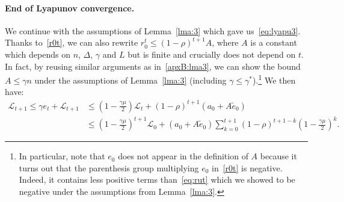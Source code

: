 \documentclass[twoside]{article}
\newcommand{\stepsize}{\gamma}
\newcommand{\strongconvex}{\mu}
\newcommand{\contraction}{\rho}
\newcommand{\sparsity}{\Delta}
\newcommand{\lipschitz}{L}
\newcommand{\lyapunov}{\mathcal{L}}
\begin{document}
\paragraph{End of Lyapunov convergence.}
We continue with the assumptions of Lemma~\ref{lma:3} which gave us~\eqref{eq:lyapu3}.
Thanks to~\eqref{r0t}, we can also rewrite $r_0^t \leq (1 -\contraction)^{t+1} A$, where $A$ is a constant which depends on $n$, $\sparsity$, $\stepsize$ and $\lipschitz$ but is finite and crucially does not depend on $t$.
In fact, by reusing similar arguments as in~\ref{apxB:lma3}, we can show the bound $A \leq \stepsize n$ under the assumptions of Lemma~\ref{lma:3} (including $\stepsize \leq \stepsize^*$).\footnote{In particular, note that $e_0$ does not appear in the definition of $A$ because it turns out that the parenthesis group multiplying $e_0$ in~\eqref{r0t} is negative. Indeed, it contains less positive terms than~\eqref{eq:rut} which we showed to be negative under the assumptions from Lemma~\ref{lma:3}.}
We then have:
\begin{align}
\lyapunov_{t+1}  \leq \stepsize e_t + \lyapunov_{t+1} 
&\leq (1-\frac{\stepsize\strongconvex}{2})\lyapunov_t  +(1 - \contraction)^{t+1} (a_0 + A \tilde e_0) 
\nonumber \\
&\leq (1-\frac{\stepsize\strongconvex}{2})^{t+1}\lyapunov_0 + (a_0 + A \tilde e_0) \sum_{k=0}^{t+1} (1 - \contraction)^{t+1 -k} (1-\frac{\stepsize\strongconvex}{2})^k .
\end{align}
\end{document}
